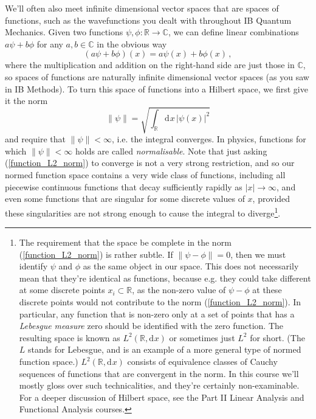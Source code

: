 \documentclass{article}
\theoremstyle{plain}\theoremheaderfont{\normalfont\itshape}\theorembodyfont{\rmfamily}\theoremseparator{.}\newtheorem*{rem}{Remark}\newtheorem*{ex}{Example}\newtheorem*{proof}{Proof}\newtheorem*{altp}{Alternative proof}
\theoremstyle{plain}\theoremheaderfont{\normalfont\bfseries}\theorembodyfont{\rmfamily}\theoremseparator{.}\newtheorem{thm}{Theorem}[section]\newtheorem{lem}[thm]{Lemma}\newtheorem{prop}[thm]{Proposition}\newtheorem*{cor}{Corollary}\newtheorem{defn}[thm]{Definition}\newtheorem{clm}[thm]{Claim}\newtheorem{clminproof}{Claim}
\theoremstyle{break}\theoremheaderfont{\normalfont\itshape}\theorembodyfont{\rmfamily}\theoremseparator{.\medskip}\newtheorem*{proofskip}{Proof}\newtheorem*{exs}{Examples}\newtheorem*{rems}{Remarks}
\theoremstyle{break}\theoremheaderfont{\normalfont\bfseries}\theorembodyfont{\rmfamily}\theoremseparator{.\medskip}\newtheorem{lemskip}[thm]{Lemma}\newtheorem{defnskip}[thm]{Definition}\newtheorem{propskip}[thm]{Proposition}\newtheorem{thmskip}[thm]{Theorem}
\numberwithin{equation}{section}
\newcommand{\dd}[2][]{\mathrm{d}^{#1} #2\,}
\renewcommand{\d}[2][]{\mathrm{d}^{#1} #2}
\newcommand{\abs}[1]{\left| #1 \right|}
\newcommand{\norm}[1]{\left\| #1 \right\|}
\newcommand{\RR}{\mathbb{R}}
\newcommand{\CC}{\mathbb{C}}
\begin{document}
    We'll often also meet infinite dimensional vector spaces that are spaces of functions, such as the wavefunctions you dealt with throughout IB Quantum Mechanics. Given two functions \(\psi,\phi:\RR\to\CC\), we can define linear combinations \(a\psi+b\phi\) for any \(a,b\in\CC\) in the obvious way
    \begin{equation}
        (a\psi+b\phi)(x)=a\psi(x)+b\phi(x)\,,
    \end{equation}
    where the multiplication and addition on the right-hand side are just those in \(\CC\), so spaces of functions are naturally infinite dimensional vector spaces (as you saw in IB Methods). To turn this space of functions into a Hilbert space, we first give it the norm
    \begin{equation}\label{function_L2_norm}
        \norm{\psi}=\sqrt{\int_\RR\dd{x}\abs{\psi(x)}^2}
    \end{equation}
    and require that \(\norm{\psi}<\infty\), i.e. the integral converges. In physics, functions for which \(\norm{\psi}<\infty\) holds are called \textit{normalisable}. Note that just asking (\ref{function_L2_norm}) to converge is not a very strong restriction, and so our normed function space contains a very wide class of functions, including all piecewise continuous functions that decay sufficiently rapidly as \(\abs{x}\to\infty\), and even some functions that are singular for some discrete values of \(x\), provided these singularities are not strong enough to cause the integral to diverge\footnote{The requirement that the space be complete in the norm (\ref{function_L2_norm}) is rather subtle. If \(\norm{\psi-\phi}=0\), then we must identify \(\psi\) and \(\phi\) as the same object in our space. This does not necessarily mean that they're identical as functions, because e.g. they could take different at some discrete points \(x_i\subset \RR\), as the non-zero value of \(\psi-\phi\) at these discrete points would not contribute to the norm (\ref{function_L2_norm}). In particular, any function that is non-zero only at a set of points that has a \textit{Lebesgue measure} zero should be identified with the zero function. The resulting space is known as \(L^2(\RR,\d{x})\) or sometimes just \(L^2\) for short. (The \(L\) stands for Lebesgue, and is an example of a more general type of normed function space.) \(L^2(\RR,\d{x})\) consists of equivalence classes of Cauchy sequences of functions that are convergent in the norm. In this course we'll mostly gloss over such technicalities, and they're certainly non-examinable. For a deeper discussion of Hilbert space, see the Part II Linear Analysis and Functional Analysis courses.}.
\end{document}
